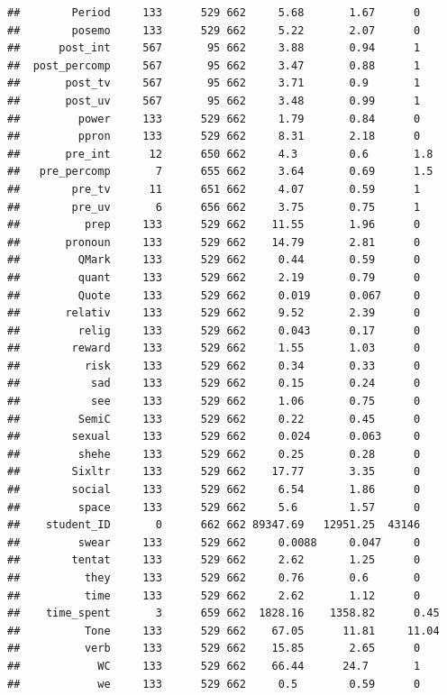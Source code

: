\documentclass[]{apa6}
\theoremstyle{definition}
\theoremstyle{definition}
\theoremstyle{definition}
\theoremstyle{remark}
\begin{document}
\begin{verbatim}
##        Period     133      529 662     5.68       1.67      0   
##        posemo     133      529 662     5.22       2.07      0   
##      post_int     567       95 662     3.88       0.94      1   
##  post_percomp     567       95 662     3.47       0.88      1   
##       post_tv     567       95 662     3.71       0.9       1   
##       post_uv     567       95 662     3.48       0.99      1   
##         power     133      529 662     1.79       0.84      0   
##         ppron     133      529 662     8.31       2.18      0   
##       pre_int      12      650 662     4.3        0.6       1.8 
##   pre_percomp       7      655 662     3.64       0.69      1.5 
##        pre_tv      11      651 662     4.07       0.59      1   
##        pre_uv       6      656 662     3.75       0.75      1   
##          prep     133      529 662    11.55       1.96      0   
##       pronoun     133      529 662    14.79       2.81      0   
##         QMark     133      529 662     0.44       0.59      0   
##         quant     133      529 662     2.19       0.79      0   
##         Quote     133      529 662     0.019      0.067     0   
##       relativ     133      529 662     9.52       2.39      0   
##         relig     133      529 662     0.043      0.17      0   
##        reward     133      529 662     1.55       1.03      0   
##          risk     133      529 662     0.34       0.33      0   
##           sad     133      529 662     0.15       0.24      0   
##           see     133      529 662     1.06       0.75      0   
##         SemiC     133      529 662     0.22       0.45      0   
##        sexual     133      529 662     0.024      0.063     0   
##         shehe     133      529 662     0.25       0.28      0   
##        Sixltr     133      529 662    17.77       3.35      0   
##        social     133      529 662     6.54       1.86      0   
##         space     133      529 662     5.6        1.57      0   
##    student_ID       0      662 662 89347.69   12951.25  43146   
##         swear     133      529 662     0.0088     0.047     0   
##        tentat     133      529 662     2.62       1.25      0   
##          they     133      529 662     0.76       0.6       0   
##          time     133      529 662     2.62       1.12      0   
##    time_spent       3      659 662  1828.16    1358.82      0.45
##          Tone     133      529 662    67.05      11.81     11.04
##          verb     133      529 662    15.85       2.65      0   
##            WC     133      529 662    66.44      24.7       1   
##            we     133      529 662     0.5        0.59      0   

\end{verbatim}
\end{document}

